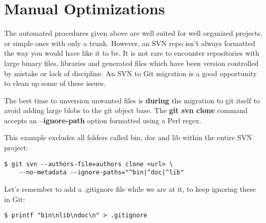 \documentclass{../../common/tufte-latex/tufte-handout}
\begin{document}
\section{Manual Optimizations}

The automated procedures given above are well suited for well organized projects, or simple ones with only a trunk.
However, an SVN repo isn't always formatted the way you would have like it to be.
It is not rare to encounter repositories with large binary files, libraries and generated files which have been version controlled by mistake or lack of discipline.
An SVN to Git migration is a good opportunity to clean up some of these issues.

The best time to unversion unwanted files is \textbf{during} the migration to git itself to avoid adding large blobs to the git object base.
The \textbf{git svn clone} command accepts an \textbf{--ignore-path} option formatted using a Perl regex.

This example excludes all folders called bin, doc and lib within the entire SVN project:

\begin{lstlisting}[style=BashInputStyle]
  $ git svn --authors-file=authors clone <url> \ 
    --no-metadata --ignore-paths="^bin|^doc|^lib"
\end{lstlisting}

Let's remember to add a .gitignore file while we are at it, to keep ignoring these in Git:

\begin{lstlisting}[style=BashInputStyle]
  $ printf "bin\nlib\ndoc\n" > .gitignore
\end{lstlisting}




\end{document}
